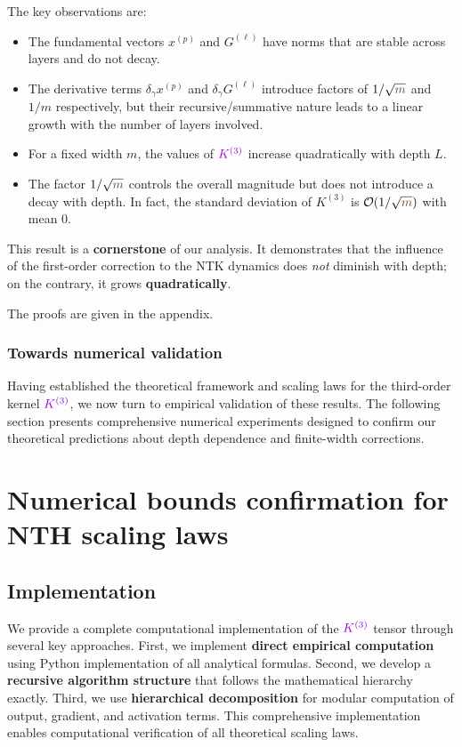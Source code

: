 \documentclass[a4paper]{article}
\newcommand{\m}{\textcolor{weightcolor}{m}}
\theoremstyle{plain}
\theoremstyle{definition}
\theoremstyle{remark}
\begin{document}
The key observations are:
\begin{itemize}
    \item The fundamental vectors $x^{(p)}$ and $G^{(\ell)}$ have norms that are stable across layers and do not decay.
    \item The derivative terms $\delta_\gamma x^{(p)}$ and $\delta_\gamma G^{(\ell)}$ introduce factors of $1/\sqrt{\m}$ and $1/m$ respectively, but their recursive/summative nature leads to a linear growth with the number of layers involved.
    \item For a fixed width $m$, the values of $\textcolor{k3color}{K^{(3)}}$ increase quadratically with depth $L$.
    \item The factor $1/\sqrt{\m}$ controls the overall magnitude but does not introduce a decay with depth. In fact, the standard deviation of $K^{(3)}$ is $\mathcal{O}(1/\sqrt{\m})$
    with mean 0.
\end{itemize}

This result is a \textbf{cornerstone} of our analysis. It demonstrates that the influence of the first-order correction to the NTK dynamics does \textit{not} diminish with depth; on the contrary, it grows \textbf{quadratically}.

The proofs are given in the appendix.

\subsubsection{Towards numerical validation}

Having established the theoretical framework and scaling laws for the third-order kernel $\textcolor{k3color}{K^{(3)}}$, we now turn to empirical validation of these results. The following section presents comprehensive numerical experiments designed to confirm our theoretical predictions about depth dependence and finite-width corrections.





\newpage


\section{Numerical bounds confirmation for NTH scaling laws}

\subsection{Implementation}
We provide a complete computational implementation of the $\textcolor{k3color}{K^{(3)}}$ tensor through several key approaches. First, we implement \textbf{direct empirical computation} using Python implementation of all analytical formulas. Second, we develop a \textbf{recursive algorithm structure} that follows the mathematical hierarchy exactly. Third, we use \textbf{hierarchical decomposition} for modular computation of output, gradient, and activation terms. This comprehensive implementation enables computational verification of all theoretical scaling laws.
\end{document}
